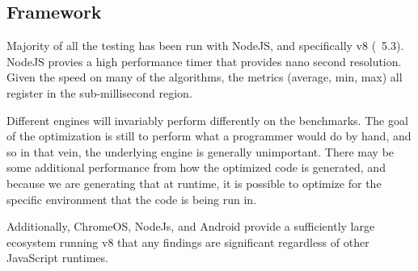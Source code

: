 \subsection{Framework}

Majority of all the testing has been run with NodeJS, and specifically v8 (~5.3).  NodeJS provies a high performance timer that provides nano second resolution.  Given the speed on many of the algorithms, the metrics (average, min, max) all register in the sub-millisecond region.  

Different engines will invariably perform differently on the benchmarks.  The goal of the optimization is still to perform what a programmer would do by hand, and so in that vein, the underlying engine is generally unimportant.  There may be some additional performance from how the optimized code is generated, and because we are generating that at runtime, it is possible to optimize for the specific environment that the code is being run in.  

Additionally, ChromeOS, NodeJs, and Android provide a sufficiently large ecosystem running v8 that any findings are significant regardless of other JavaScript runtimes.

